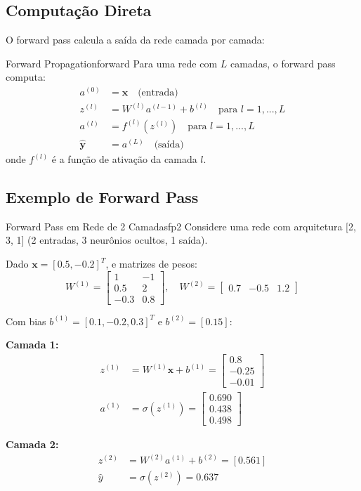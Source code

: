 \documentclass[a4paper,12pt]{article}
\begin{document}
\subsection{Computação Direta}

O forward pass calcula a saída da rede camada por camada:

\begin{definicao}{Forward Propagation}{forward}
Para uma rede com $L$ camadas, o forward pass computa:
\begin{align}
    a^{(0)} &= \mathbf{x} \quad \text{(entrada)} \\
    z^{(l)} &= W^{(l)} a^{(l-1)} + b^{(l)} \quad \text{para } l = 1, ..., L \\
    a^{(l)} &= f^{(l)}(z^{(l)}) \quad \text{para } l = 1, ..., L \\
    \hat{\mathbf{y}} &= a^{(L)} \quad \text{(saída)}
\end{align}
onde $f^{(l)}$ é a função de ativação da camada $l$.
\end{definicao}

\subsection{Exemplo de Forward Pass}

\begin{exemplo}{Forward Pass em Rede de 2 Camadas}{fp2}
Considere uma rede com arquitetura [2, 3, 1] (2 entradas, 3 neurônios ocultos, 1 saída).

Dado $\mathbf{x} = [0.5, -0.2]^T$, e matrizes de pesos:
$$W^{(1)} = \begin{bmatrix} 1 & -1 \\ 0.5 & 2 \\ -0.3 & 0.8 \end{bmatrix}, \quad 
W^{(2)} = \begin{bmatrix} 0.7 & -0.5 & 1.2 \end{bmatrix}$$

Com bias $b^{(1)} = [0.1, -0.2, 0.3]^T$ e $b^{(2)} = [0.15]$:

\textbf{Camada 1:}
\begin{align}
z^{(1)} &= W^{(1)}\mathbf{x} + b^{(1)} = \begin{bmatrix} 0.8 \\ -0.25 \\ -0.01 \end{bmatrix} \\
a^{(1)} &= \sigma(z^{(1)}) = \begin{bmatrix} 0.690 \\ 0.438 \\ 0.498 \end{bmatrix}
\end{align}

\textbf{Camada 2:}
\begin{align}
z^{(2)} &= W^{(2)}a^{(1)} + b^{(2)} = [0.561] \\
\hat{y} &= \sigma(z^{(2)}) = 0.637
\end{align}
\end{exemplo}
\end{document}
